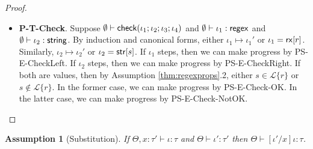\documentclass[11pt,leqno]{article}
\newtheorem{ass}[tr]{Assumption}
\theoremstyle{definition}
\newcommand{\Lagr}{\mathcal{L}}
\newcommand{\lang}[1]{\Lagr\{#1\}}
\newcommand{\tcheck}[4]{{\sf check}(#1; #2; #3; #4)}
\renewcommand{\tstr}[1]{{{\sf str}[#1]}}
\newcommand{\rx}[1]{ {\sf rx}[#1] }
\newcommand{\str}{{\sf string}}
\newcommand{\regex}{{\sf regex}}
\begin{document}
\begin{proof}
\begin{itemize}[label=$ $,itemsep=1ex]
\item \textbf{P-T-Check}.
Suppose $\emptyset \vdash \tcheck{\iota_1}{\iota_2}{\iota_3}{\iota_4}$ and $\emptyset \vdash \iota_1 : \regex$ and $\emptyset \vdash \iota_2 : \str$. By induction and canonical forms, either $\iota_1 \mapsto \iota_1'$ or $\iota_1 = \rx{r}$. Similarly, $\iota_2 \mapsto \iota_2'$ or $\iota_2 = \tstr{s}$. If $\iota_1$ steps, then we can make progress by PS-E-CheckLeft. If $\iota_2$ steps, then we can make progress by PS-E-CheckRight. If both are values, then by Assumption \ref{thm:regexprops}.2, either $s \in \lang{r}$ or $s\notin\lang{r}$. In the former case, we can make progress by PS-E-Check-OK. In the latter case, we can make progress by PS-E-Check-NotOK.
\end{itemize}
\end{proof}

\begin{ass}[Substitution] \label{lem:psubst}
If $\Theta, x : \tau' \vdash \iota : \tau$ and $\Theta \vdash \iota' : \tau'$
then $\Theta \vdash [\iota' / x]\iota : \tau$.
\end{ass}
\end{document}
